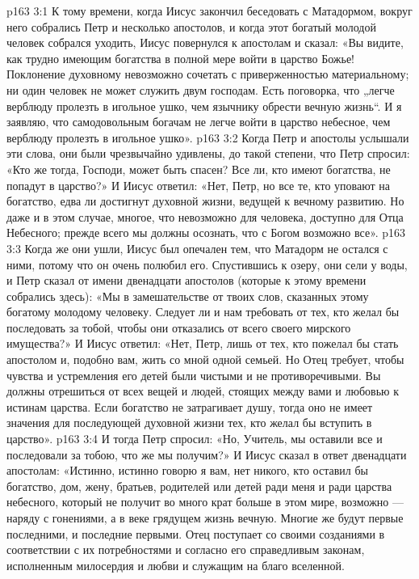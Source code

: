 \vs p163 3:1 К тому времени, когда Иисус закончил беседовать с Матадормом, вокруг него собрались Петр и несколько апостолов, и когда этот богатый молодой человек собрался уходить, Иисус повернулся к апостолам и сказал: «Вы видите, как трудно имеющим богатства в полной мере войти в царство Божье! Поклонение духовному невозможно сочетать с приверженностью материальному; ни один человек не может служить двум господам. Есть поговорка, что „легче верблюду пролезть в игольное ушко, чем язычнику обрести вечную жизнь“. И я заявляю, что самодовольным богачам не легче войти в царство небесное, чем верблюду пролезть в игольное ушко».
\vs p163 3:2 Когда Петр и апостолы услышали эти слова, они были чрезвычайно удивлены, до такой степени, что Петр спросил: «Кто же тогда, Господи, может быть спасен? Все ли, кто имеют богатства, не попадут в царство?» И Иисус ответил: «Нет, Петр, но все те, кто уповают на богатство, едва ли достигнут духовной жизни, ведущей к вечному развитию. Но даже и в этом случае, многое, что невозможно для человека, доступно для Отца Небесного; прежде всего мы должны осознать, что с Богом возможно все».
\vs p163 3:3 Когда же они ушли, Иисус был опечален тем, что Матадорм не остался с ними, потому что он очень полюбил его. Спустившись к озеру, они сели у воды, и Петр сказал от имени двенадцати апостолов (которые к этому времени собрались здесь): «Мы в замешательстве от твоих слов, сказанных этому богатому молодому человеку. Следует ли и нам требовать от тех, кто желал бы последовать за тобой, чтобы они отказались от всего своего мирского имущества?» И Иисус ответил: «Нет, Петр, лишь от тех, кто пожелал бы стать апостолом и, подобно вам, жить со мной одной семьей. Но Отец требует, чтобы чувства и устремления его детей были чистыми и не противоречивыми. Вы должны отрешиться от всех вещей и людей, стоящих между вами и любовью к истинам царства. Если богатство не затрагивает душу, тогда оно не имеет значения для последующей духовной жизни тех, кто желал бы вступить в царство».
\vs p163 3:4 И тогда Петр спросил: «Но, Учитель, мы оставили все и последовали за тобою, что же мы получим?» И Иисус сказал в ответ двенадцати апостолам: «Истинно, истинно говорю я вам, нет никого, кто оставил бы богатство, дом, жену, братьев, родителей или детей ради меня и ради царства небесного, который не получит во много крат больше в этом мире, возможно --- наряду с гонениями, а в веке грядущем жизнь вечную. Многие же будут первые последними, и последние первыми. Отец поступает со своими созданиями в соответствии с их потребностями и согласно его справедливым законам, исполненным милосердия и любви и служащим на благо вселенной.
